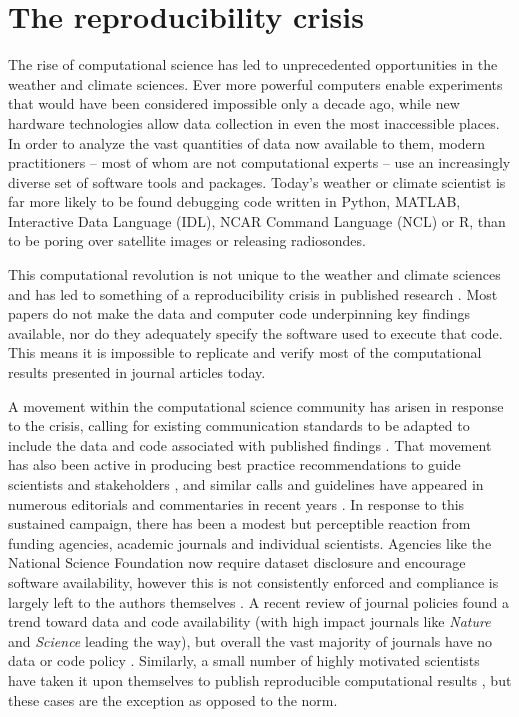 \section{The reproducibility crisis}

The rise of computational science has led to unprecedented opportunities in the weather and climate sciences. Ever more powerful computers enable experiments that would have been considered impossible only a decade ago, while new hardware technologies allow data collection in even the most inaccessible places. In order to analyze the vast quantities of data now available to them, modern practitioners – most of whom are not computational experts – use an increasingly diverse set of software tools and packages. Today's weather or climate scientist is far more likely to be found debugging code written in Python, MATLAB, Interactive Data Language (IDL), NCAR Command Language (NCL) or R, than to be poring over satellite images or releasing radiosondes. 

This computational revolution is not unique to the weather and climate sciences and has led to something of a reproducibility crisis in published research \citep[e.g.][]{Peng2011}. Most papers do not make the data and computer code underpinning key findings available, nor do they adequately specify the software used to execute that code. This means it is impossible to replicate and verify most of the computational results presented in journal articles today.

A movement within the computational science community has arisen in response to the crisis, calling for existing communication standards to be adapted to include the data and code associated with published findings \citep[e.g.][]{Stodden2014}. That movement has also been active in producing best practice recommendations to guide scientists and stakeholders \citep[e.g.][]{Prlic2012,Sandve2013,Stodden2012a,Stodden2014}, and similar calls and guidelines have appeared in numerous editorials and commentaries in recent years \citep[e.g.][]{Barnes2010,Ince2012,Merali2010}. In response to this sustained campaign, there has been a modest but perceptible reaction from funding agencies, academic journals and individual scientists. Agencies like the National Science Foundation now require dataset disclosure and encourage software availability, however this is not consistently enforced and compliance is largely left to the authors themselves \citep{Stodden2013}. A recent review of journal policies found a trend toward data and code availability (with high impact journals like \textit{Nature} and \textit{Science} leading the way), but overall the vast majority of journals have no data or code policy \citep{Stodden2013}. Similarly, a small number of highly motivated scientists have taken it upon themselves to publish reproducible computational results \citep[e.g.][]{Crooks2014,Ketcheson2012,Schmitt2015}, but these cases are the exception as opposed to the norm.

